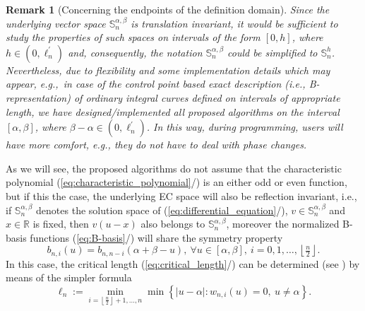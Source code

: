 \documentclass[b5paper, twosided]{book}
\newtheorem{remark}{Remark}[chapter]
\DeclareRobustCommand{\mref}[1]{\ref{#1}{\relsize{-1}/\pageref{#1}}}
\begin{document}
\begin{remark}[Concerning the endpoints of the definition domain]
    Since the un\-der\-ly\-ing vec\-tor space $\mathbb{S}_n^{\alpha,\beta}$ is trans\-la\-tion invariant, it would be sufficient to study the properties of such spaces on intervals of the form $[0,h]$, where $h \in \left(0,\ell_n^{\prime}\right)$ and, consequently, the notation $\mathbb{S}_{n}^{\alpha,\beta}$ could be simplified to $\mathbb{S}_{n}^{h}$. Nevertheless, due to flexibility and some implementation details which may appear, e.g.,\ in case of the control point based exact description (i.e., B-representation) of ordinary integral curves defined on intervals of appropriate length, we have designed/implemented all proposed algorithms on the interval $\left[\alpha,\beta\right]$, where $\beta - \alpha \in \left(0,\ell_n^{\prime}\right)$. In this way, during programming, users will have more comfort, e.g., they do not have to deal with phase changes.
\end{remark}  

As we will see, the proposed algorithms do not assume that the characteristic polynomial (\mref{eq:characteristic_polynomial}) is an either odd or even function, but if this the case, the underlying EC space will also be reflection invariant, i.e., if $\mathbb{S}_n^{\alpha,\beta}$ denotes the solution space of (\mref{eq:differential_equation}), $v\in\mathbb{S}_n^{\alpha,\beta}$ and $x\in\mathbb{R}$ is fixed, then $v\left(u - x\right)$ also belongs to  $\mathbb{S}_n^{\alpha,\beta}$, moreover the normalized B-basis functions (\mref{eq:B-basis}) will share the symmetry property 
\begin{equation}
    b_{n,i}\left(u\right)=b_{n,n-i}\left(\alpha + \beta - u\right),~\forall u \in \left[\alpha, \beta\right],~i=0,1,\ldots,\left\lfloor \tfrac{n}{2}\right\rfloor.
    \label{eq:symmetry}
\end{equation}
In this case, the critical length (\mref{eq:critical_length}) can be determined (see \cite[Proposition 3.2]{CarnicerMainarPena2004}) by means of the simpler formula
\begin{equation}
    \ell_{n}:=\min_{i=\left\lfloor \frac{n}{2}\right\rfloor +1,\ldots
        ,n}\min\left\{  \left\vert u - \alpha\right\vert :w_{n,i}\left(  u\right)
    =0,~u\neq\alpha\right\}.
    \label{eq:critical_length_reflection_invariant}
\end{equation}
\end{document}
